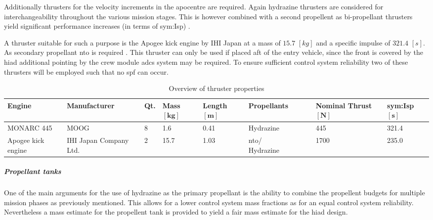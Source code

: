 Additionally thrusters for the velocity increments in the apocentre are required. Again hydrazine thrusters are considered for interchangeability throughout the various mission stages. This is however combined with a second propellent as bi-propellant thrusters yield significant performance increases (in terms of \gls{sym:Isp}) \cite{Wertz2011}. 

A thruster suitable for such a purpose is the Apogee kick engine by IHI Japan at a mass of $15.7$ $[kg]$ and a specific impulse of $321.4$ $[s]$. As secondary propellant \gls{nto} is required \cite[p.538]{Wertz2011}. This thruster can only be used if placed aft of the entry vehicle, since the front is covered by the \gls{hiad} additional pointing by the crew module \gls{adcs} system may be required. To ensure sufficient control system reliability two of these thrusters will be employed such that no \gls{spf} can occur. 

\begin{table}[h]
	\centering
\caption[Overview of thruster properties]{Overview of thruster properties \cite[p.538]{Wertz2011}}
\label{tab:thrusters}
\hspace{-5mm}
\begin{tabular}{|p{}|p{}|p{}|p{}|p{}|p{}|p{}|l|} \hline 
\textbf{Engine    }          &\textbf{ Manufacturer }         & \textbf{Qt.} &\textbf{Mass $\mathbf{[kg]}$}      & \textbf{Length $\mathbf{[m]}$} & \textbf{Propellants}  & \textbf{Nominal Thrust $\mathbf{[N]}$} & \textbf{\gls{sym:Isp} $\mathbf{[s]}$} \\ \hline \hline
MONARC 445          & MOOG                  & 8        & 1.6  & 0.41 & Hydrazine     & 445         & 321.4   \\ \hline
Apogee kick engine & IHI Japan Company Ltd. & 2        & 15.7 & 1.03 & \gls{nto}/ ~~~~~ Hydrazine & 1700        & 235.0     \\ \hline
\end{tabular}
\end{table}


\subparagraph{Propellant tanks}
One of the main arguments for the use of hydrazine as the primary propellant is the ability to combine the propellent budgets for multiple mission phases as previously mentioned. This allows for a lower control system mass fractions as for an equal control system reliability. Nevertheless a mass estimate for the propellent tank is provided to yield a fair mass estimate for the \gls{hiad} design. 

